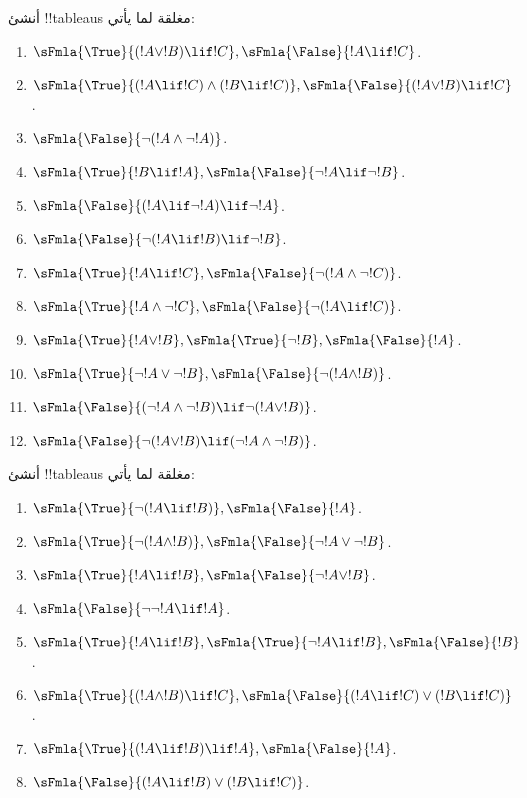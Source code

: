 \documentclass[../../../include/open-logic-section]{subfiles}
\begin{document}
\begin{prob}
أنشئ !!{tableau}s مغلقة لما يأتي:
\begin{enumerate}
\item $\sFmla{\True}{(!A \lor !B) \lif !C}, \sFmla{\False}{!A \lif !C}$.
\item $\sFmla{\True}{(!A \lif !C) \land (!B \lif !C)}, \sFmla{\False}{(!A \lor !B) \lif !C}$.
\item $\sFmla{\False}{\lnot(!A \land \lnot !A)}$.
\item $\sFmla{\True}{!B \lif !A}, \sFmla{\False}{\lnot !A \lif \lnot !B}$.
\item $\sFmla{\False}{(!A \lif \lnot !A) \lif \lnot !A}$.
\item $\sFmla{\False}{\lnot(!A \lif !B) \lif \lnot !B}$.
\item $\sFmla{\True}{!A \lif !C}, \sFmla{\False}{\lnot (!A \land \lnot !C)}$.
\item $\sFmla{\True}{!A \land \lnot !C}, \sFmla{\False}{\lnot (!A \lif !C)}$.
\item $\sFmla{\True}{!A \lor !B}, \sFmla{\True}{\lnot !B}, \sFmla{\False}{!A}$.
\item $\sFmla{\True}{\lnot !A \lor \lnot !B}, \sFmla{\False}{\lnot(!A \land !B)}$.
\item $\sFmla{\False}{(\lnot !A \land \lnot !B) \lif\lnot(!A \lor !B)}$.
\item $\sFmla{\False}{\lnot(!A \lor !B) \lif (\lnot !A \land \lnot !B)}$.
\end{enumerate}
\end{prob}

\begin{prob}
أنشئ !!{tableau}s مغلقة لما يأتي:
\begin{enumerate}
\item $\sFmla{\True}{\lnot(!A \lif !B)}, \sFmla{\False}{!A}$.
\item $\sFmla{\True}{\lnot(!A \land !B)}, \sFmla{\False}{\lnot !A \lor \lnot !B}$.
\item $\sFmla{\True}{!A \lif !B}, \sFmla{\False}{\lnot !A \lor !B}$.
\item $\sFmla{\False}{\lnot \lnot !A \lif !A}$.
\item $\sFmla{\True}{!A \lif !B}, \sFmla{\True}{\lnot !A \lif !B}, \sFmla{\False}{!B}$.
\item $\sFmla{\True}{(!A \land !B) \lif !C}, \sFmla{\False}{(!A \lif !C) \lor (!B \lif !C)}$.
\item $\sFmla{\True}{(!A \lif !B) \lif !A}, \sFmla{\False}{!A}$.
\item $\sFmla{\False}{(!A \lif !B) \lor (!B \lif !C)}$.
\end{enumerate}
\end{prob}
\end{document}
